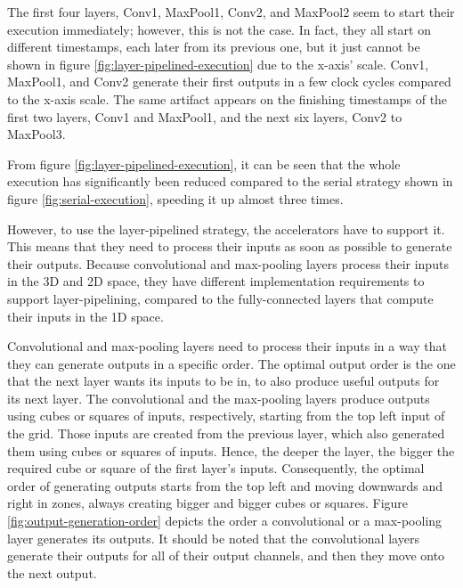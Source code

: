 The first four layers, Conv1, MaxPool1, Conv2, and MaxPool2 seem to start their execution immediately; however, this is not the case. In fact, they all start on different timestamps, each later from its previous one, but it just cannot be shown in figure \ref{fig:layer-pipelined-execution} due to the x-axis' scale. Conv1, MaxPool1, and Conv2 generate their first outputs in a few clock cycles compared to the x-axis scale. The same artifact appears on the finishing timestamps of the first two layers, Conv1 and MaxPool1, and the next six layers, Conv2 to MaxPool3.

From figure \ref{fig:layer-pipelined-execution}, it can be seen that the whole execution has significantly been reduced compared to the serial strategy shown in figure \ref{fig:serial-execution}, speeding it up almost three times.

However, to use the layer-pipelined strategy, the accelerators have to support it. This means that they need to process their inputs as soon as possible to generate their outputs. Because convolutional and max-pooling layers process their inputs in the 3D and 2D space, they have different implementation requirements to support layer-pipelining, compared to the fully-connected layers that compute their inputs in the 1D space.

Convolutional and max-pooling layers need to process their inputs in a way that they can generate outputs in a specific order. The optimal output order is the one that the next layer wants its inputs to be in, to also produce useful outputs for its next layer. The convolutional and the max-pooling layers produce outputs using cubes or squares of inputs, respectively, starting from the top left input of the grid. Those inputs are created from the previous layer, which also generated them using cubes or squares of inputs. Hence, the deeper the layer, the bigger the required cube or square of the first layer's inputs. Consequently, the optimal order of generating outputs starts from the top left and moving downwards and right in zones, always creating bigger and bigger cubes or squares. Figure \ref{fig:output-generation-order} depicts the order a convolutional or a max-pooling layer generates its outputs. It should be noted that the convolutional layers generate their outputs for all of their output channels, and then they move onto the next output.


